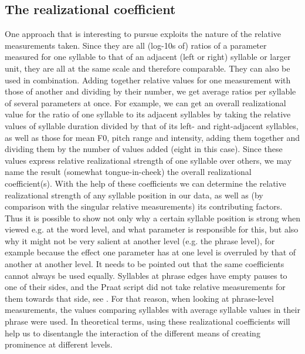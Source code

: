 \documentclass[output=paper]{LSP/langsci}
\begin{document}
\subsection{The realizational coefficient} 
One approach that is interesting to pursue exploits the nature of the relative measurements taken. Since they are all (log-10s of) ratios of a parameter measured for one syllable to that of an adjacent (left or right) syllable or larger unit, they are all at the same scale and therefore comparable. They can also be used in combination. Adding together relative values for one measurement with those of another and dividing by their number, we get average ratios per syllable of several parameters at once. For example, we can get an overall realizational value for the ratio of one syllable to its adjacent syllables by taking the relative values of syllable duration divided by that of its left- and right-adjacent syllables, as well as those for mean F0, pitch range and intensity, adding them together and dividing them by the number of values added (eight in this case). Since these values express relative realizational strength of one syllable over others, we may name the result (somewhat tongue-in-cheek) the overall realizational coefficient(s). With the help of these coefficients we can determine the relative realizational strength of any syllable position in our data, as well as (by comparison with the singular relative measurements) its contributing factors. Thus it is possible to show not only why a certain syllable position is strong when viewed e.g. at the word level, and what parameter is responsible for this, but also why it might not be very salient at another level (e.g. the phrase level), for example because the effect one parameter has at one level is overruled by that of another at another level. It needs to be pointed out that the same coefficients cannot always be used equally. Syllables at phrase edges have empty pauses to one of their sides, and the {Praat} script did not take relative measurements for them towards that side, see . For that reason, when looking at phrase-level measurements, the values comparing syllables with average syllable values in their phrase were used. In theoretical terms, using these realizational coefficients will help us to disentangle the interaction of the different means of creating prominence at different levels.
\end{document}
